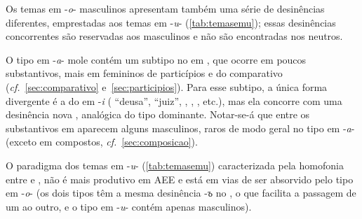 

Os temas em -\emph{o}- masculinos apresentam também uma série de
desinências diferentes, emprestadas aos temas em -\emph{u}- (\autoref{tab:temasemu});
essas desinências concorrentes são reservadas aos masculinos e não são
encontradas nos neutros.
\clearpage




O tipo em -\emph{a}- mole contém um subtipo no  em
, que ocorre em poucos substantivos, mais em femininos de
particípios e do comparativo (\emph{cf.}~\ref{sec:comparativo} e~\ref{sec:participios}).
Para esse subtipo, a única forma divergente é a do  em -\emph{i}
(  ``deusa'',  
``juiz'',  , ,
 ,  etc.), mas ela concorre com uma
desinência nova , analógica do tipo dominante.
Notar-se-á
que entre os substantivos em  aparecem alguns
masculinos, raros de modo geral no tipo em -\emph{a}- (exceto em
compostos, \emph{cf.}~\ref{sec:composicao}).

O paradigma dos temas em -\emph{u}- (\autoref{tab:temasemu}) caracterizada pela
homofonia entre  e , não é mais produtivo em AEE e está em
vias de ser absorvido pelo tipo em -\emph{o}- (os dois tipos têm a mesma
desinência -\emph{ъ} no , o que facilita a passagem de um ao
outro, e o tipo em -\emph{u}- contém apenas masculinos).
\clearpage




